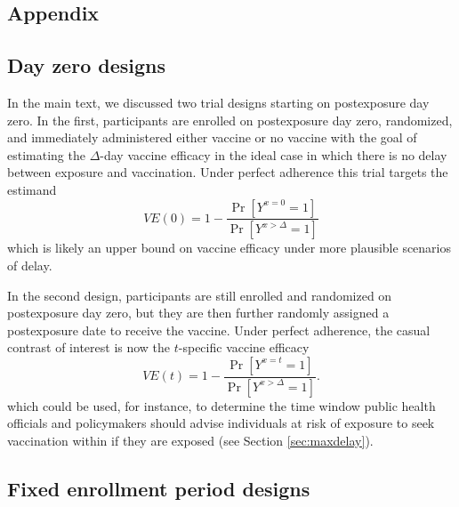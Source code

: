 \begin{appendix}

    \renewcommand{\thefigure}{A\arabic{figure}}
    \setcounter{figure}{0}
    
    \renewcommand{\thetable}{A\arabic{table}}
    \setcounter{table}{0}
    
    \renewcommand{\theequation}{A\arabic{equation}}
    \setcounter{equation}{0}

    \newpage

    \section{Appendix}

    \subsection{Day zero designs} \label{sec:dayzero}
    In the main text, we discussed two trial designs starting on postexposure day zero. In the first, participants are enrolled on postexposure day zero, randomized, and immediately administered either vaccine or no vaccine with the goal of estimating the $\Delta$-day vaccine efficacy in the ideal case in which there is no delay between exposure and vaccination. Under perfect adherence this trial targets the estimand
    $$VE(0) = 1 - \frac{\Pr[Y^{x = 0} = 1]}{\Pr[Y^{x > \Delta} = 1]}$$
    which is likely an upper bound on vaccine efficacy under more plausible scenarios of delay. 

    In the second design, participants are still enrolled and randomized on postexposure day zero, but they are then further randomly assigned a postexposure date to receive the vaccine.  Under perfect adherence, the casual contrast of interest is now the $t$-specific vaccine efficacy
    $$VE(t) = 1 - \frac{\Pr[Y^{x = t} = 1]}{\Pr[Y^{x > \Delta} = 1]}.$$
    which could be used, for instance, to determine the time window public health officials and policymakers should advise individuals at risk of exposure to seek vaccination within if they are exposed (see Section \ref{sec:maxdelay}).

    \subsection{Fixed enrollment period designs} \label{sec:enrollment}


\end{appendix}

